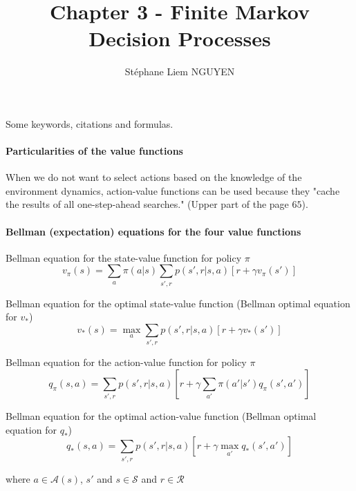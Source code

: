 \documentclass[10pt,a4paper]{article}
\title{Chapter 3 - Finite Markov Decision Processes}
\author{Stéphane Liem NGUYEN}
\begin{document}
\maketitle

Some keywords, citations and formulas.

\paragraph{Particularities of the value functions} When we do not want to select actions based on the knowledge of the environment dynamics, action-value functions can be used because they "cache the results of all
one-step-ahead searches." (Upper part of the page $65$).

\paragraph{Bellman (expectation) equations for the four value functions}

Bellman equation for the state-value function for policy $\pi$
\begin{equation}
v_\pi(s) = \sum_{a} \pi(a \lvert s) \sum_{s', r} p(s', r \lvert s, a) \left[r + \gamma v_\pi(s')\right]
\end{equation}

Bellman equation for the optimal state-value function (Bellman optimal equation for $v_*$)
\begin{equation}
v_*(s) = \max_{a} \sum_{s', r} p(s', r \lvert s, a) \left[r + \gamma v_*(s')\right]
\end{equation}

Bellman equation for the action-value function for policy $\pi$
\begin{equation}
q_\pi(s, a) = \sum_{s', r} p(s', r \lvert s, a) \left[r + \gamma \sum_{a'} \pi(a' \lvert s') q_\pi(s', a')\right]
\end{equation}

Bellman equation for the optimal action-value function (Bellman optimal equation for $q_*$)
\begin{equation}
q_*(s, a) = \sum_{s', r} p(s', r \lvert s, a) \left[r + \gamma \max_{a'} q_*(s', a')\right]
\end{equation}


where $a \in \mathcal{A}(s)$, $s'$ and $s \in \mathcal{S}$ and $r \in \mathcal{R}$
\end{document}
